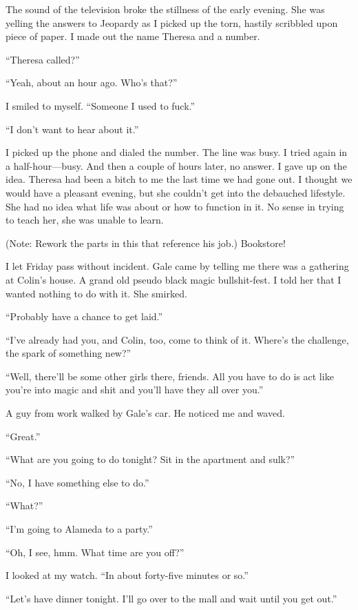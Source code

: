 The sound of the television broke the stillness of the early evening.
She was yelling the answers to Jeopardy as I picked up the torn, hastily
scribbled upon piece of paper. I made out the name Theresa and a number.

``Theresa called?''

``Yeah, about an hour ago. Who's that?''

I smiled to myself. ``Someone I used to fuck.''

``I don't want to hear about it.''

I picked up the phone and dialed the number. The line was busy. I tried
again in a half-hour---busy. And then a couple of hours later, no
answer. I gave up on the idea. Theresa had been a bitch to me the last
time we had gone out. I thought we would have a pleasant evening, but
she couldn't get into the debauched lifestyle. She had no idea what life
was about or how to function in it. No sense in trying to teach her, she
was unable to learn.

(Note: Rework the parts in this that reference his job.) Bookstore!

I let Friday pass without incident. Gale came by telling me there was a
gathering at Colin's house. A grand old pseudo black magic
bullshit-fest. I told her that I wanted nothing to do with it. She
smirked.

``Probably have a chance to get laid.''

``I've already had you, and Colin, too, come to think of it. Where's the
challenge, the spark of something new?''

``Well, there'll be some other girls there, friends. All you have to do
is act like you're into magic and shit and you'll have they all over
you.''

A guy from work walked by Gale's car. He noticed me and waved.

``Great.''

``What are you going to do tonight? Sit in the apartment and sulk?''

``No, I have something else to do.''

``What?''

``I'm going to Alameda to a party.''

``Oh, I see, hmm. What time are you off?''

I looked at my watch. ``In about forty-five minutes or so.''

``Let's have dinner tonight. I'll go over to the mall and wait until you
get out.''


